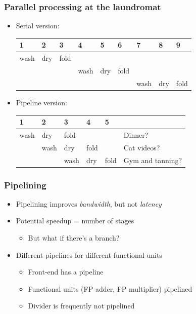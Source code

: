 \documentclass{beamer}
\begin{document}
\begin{frame}
  \frametitle{Parallel processing at the laundromat}

  \begin{itemize}
  \item Serial version: \\[2mm]
        \begin{tabular}{lllllllll}
          1 & 2 & 3 & 4 & 5 & 6 & 7 & 8 & 9 \\ \hline
          {\color{blue} wash} & {\color{blue} dry} & {\color{blue} fold} & & & & & & \\
          & & & {\color{red} wash} & {\color{red} dry} & {\color{red} fold} & & & \\
          & & & & & & {\color{green} wash} & {\color{green} dry} & {\color{green} fold} \\ \hline
        \end{tabular}
  \item Pipeline version: \\[2mm]
        \begin{tabular}{lllll|l}
          1 & 2 & 3 & 4 & 5 \\ \hline
          {\color{blue} wash} & {\color{blue} dry} & {\color{blue} fold} & & & Dinner? \\
          & {\color{red} wash} & {\color{red} dry} & {\color{red} fold} & & Cat videos? \\
          & & {\color{green} wash} & {\color{green} dry} & {\color{green} fold} & Gym and tanning? \\ \hline
        \end{tabular}

  \end{itemize}
\end{frame}

\begin{frame}
  \frametitle{Pipelining}
  
  \begin{itemize}
  \item Pipelining improves {\em bandwidth}, but not {\em latency}
  \item Potential speedup = number of stages
    \begin{itemize}
    \item But what if there's a branch?
    \end{itemize}
  \item Different pipelines for different functional units
    \begin{itemize}
    \item Front-end has a pipeline
    \item Functional units (FP adder, FP multiplier) pipelined
    \item Divider is frequently not pipelined
    \end{itemize}
  \end{itemize}
\end{frame}
\end{document}
